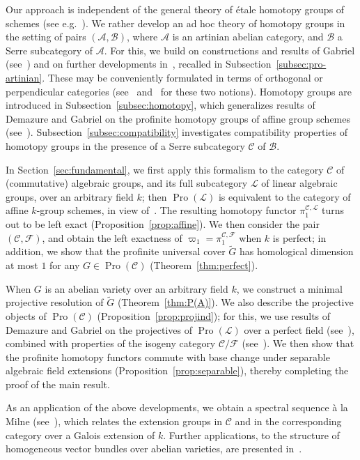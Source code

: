 \documentclass[11pt]{article}
\theoremstyle{definition}
\numberwithin{equation}{section}
\newcommand\cA{{\mathcal A}}
\newcommand\cB{{\mathcal B}}
\newcommand\cC{{\mathcal C}}
\newcommand\cF{{\mathcal F}}
\newcommand\cL{{\mathcal L}}
\newcommand\tG{{\widetilde G}}
\DeclareMathOperator{\Pro}{Pro}
\theoremstyle{remark}
\begin{document}
Our approach is independent of the general theory of \'etale homotopy groups of schemes (see e.g.~\cite{AM, Friedlander}). We rather develop an ad hoc theory of homotopy groups in the setting of pairs $(\cA,\cB)$, where $\cA$ is an artinian abelian category, and $\cB$ a Serre subcategory of $\cA$. For this, we build on constructions and results of Gabriel (see~\cite[Chap.~III]{Gabriel}) and on further developments in~\cite{Br17b}, recalled in Subsection~\ref{subsec:pro-artinian}. These may be conveniently formulated in terms of orthogonal or perpendicular categories (see~\cite[II.2]{BR} and~\cite{GL} for these two notions). Homotopy groups are introduced in Subsection~\ref{subsec:homotopy}, which generalizes results of Demazure and Gabriel on the profinite homotopy groups of affine group schemes (see~\cite[V.3.3]{DG}). Subsection~\ref{subsec:compatibility} investigates compatibility properties of homotopy groups in the presence of a Serre subcategory $\cC$ of $\cB$.

In Section~\ref{sec:fundamental}, we first apply this formalism to the category $\cC$ of (commutative) algebraic groups, and its full subcategory $\cL$ of linear algebraic groups, over an arbitrary field $k$; then $\Pro(\cL)$ is equivalent to the category of affine $k$-group schemes, in view of~\cite[V.2.2.2]{DG}. The resulting homotopy functor $\pi_1^{\cC,\cL}$ turns out to be left exact (Proposition~\ref{prop:affine}). We then consider the pair $(\cC,\cF)$, and obtain the left exactness of $\varpi_1 = \pi_1^{\cC,\cF}$ when $k$ is perfect; in addition, we show that the profinite universal cover $\tG$ has homological dimension at most $1$ for any $G \in \Pro(\cC)$ (Theorem~\ref{thm:perfect}).

When $G$ is an abelian variety over an arbitrary field $k$, we construct a minimal projective resolution of $\tG$ (Theorem~\ref{thm:P(A)}). We also describe the projective objects of $\Pro(\cC)$ (Proposition~\ref{prop:projind}); for this, we use results of Demazure and Gabriel on the projectives of $\Pro(\cL)$ over a perfect field (see~\cite[V.3.7]{DG}), combined with properties of the isogeny category $\cC/\cF$ (see~\cite{Br17a}). We then show that the profinite homotopy functors commute with base change under separable algebraic field extensions (Proposition~\ref{prop:separable}), thereby completing the proof of the main result.

As an application of the above developments, we obtain a spectral sequence \`a la Milne (see~\cite{Milne}), which relates the extension groups in $\cC$ and in the corresponding category over a Galois extension of $k$. Further applications, to the structure of homogeneous vector bundles over abelian varieties, are presented in~\cite{Br18}.
\end{document}
